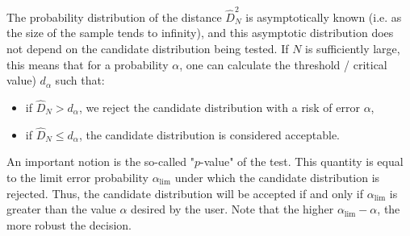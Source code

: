 {  The probability distribution of the distance $\widehat{D}_N^2$ is asymptotically known (i.e. as the size of the sample tends to infinity), and this asymptotic distribution does not depend on the candidate distribution being tested. If $N$ is sufficiently large, this means that for a probability $\alpha$, one can calculate the threshold / critical value) $d_\alpha$ such that:
  \begin{itemize}
  \item if  $\widehat{D}_N>d_{\alpha}$, we reject the candidate distribution with a risk of error $\alpha$,
  \item if  $\widehat{D}_N \leq d_{\alpha}$, the candidate distribution is considered acceptable.
  \end{itemize}

  An important notion is the so-called "$p$-value" of the test. This quantity is equal to the limit error probability $\alpha_\textrm{lim}$ under which the candidate distribution is rejected. Thus, the candidate distribution will be accepted if and only if $\alpha_\textrm{lim}$ is greater than the value $\alpha$ desired by the user. Note that the higher $\alpha_\textrm{lim} - \alpha$, the more robust the decision.
}
{
}


